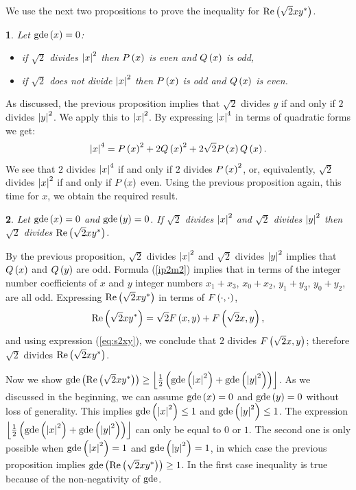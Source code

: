 \documentclass[english,journal]{extarticle}
\makeatletter
\theoremstyle{plain}
\theoremstyle{plain}
\theoremstyle{plain}
\theoremstyle{definition}
\theoremstyle{plain}
\newenvironment{proof}[1][\proofname]{\par
     \normalfont\topsep6\p@\@plus6\p@\relax
     \trivlist
     \itemindent\parindent
     \item[\hskip\labelsep
           \scshape
       #1]\ignorespaces
   }{%
     \endtrivlist\@endpefalse
   }
\providecommand{\proofname}{Proof}
\theoremstyle{plain}
\newtheorem{prop}{\protect\propositionname}
\providecommand{\propositionname}{\inputencoding{latin9}Proposition}
\makeatother
\begin{document}
We use the next two propositions to prove the inequality for
$\re\left(\sqrt{2}xy^{\ast}\right)$.
\begin{prop}
Let $\gde\left(x\right)=0$: 
\begin{itemize}
\item if $\sqrt{2}$ divides \textup{$\abs x^{2}$} then $\P x$ is even
and $\Q x$ is odd,
\item if $\sqrt{2}$ does not divide \textup{$\abs x^{2}$} then $\P x$
is odd and $\Q x$ is even.
\end{itemize}
\end{prop}
\begin{proof}
As discussed, the previous proposition implies that $\sqrt{2}$
divides $y$ if and only if $2$ divides $\abs y^{2}$. We apply this
to $\abs x^{2}$. By expressing $\abs x^{4}$ in terms of quadratic
forms we get: 
\[
\abs x^{4}=\P{x}^{2}+2\Q{x}^{2}+2\sqrt{2}\P{x}\Q{x}.
\]
We see that $2$ divides $\abs x^{4}$ if and only if $2$ divides
$\P{x}^{2}$, or, equivalently, $\sqrt{2}$ divides $\abs x^{2}$
if and only if $\P{x}$ even. Using the previous proposition again, this
time for $x$, we obtain the required result.
\end{proof}

\begin{prop}
Let $\gde\left(x\right)=0$ and $\gde\left(y\right)=0$. If $\sqrt{2}$
divides \textup{$\abs x^{2}$} and $\sqrt{2}$ divides $\abs y^{2}$
then $\sqrt{2}$ divides $\re\left(\sqrt{2}xy^{\ast}\right)$. \end{prop}
\begin{proof}
By the previous proposition, $\sqrt{2}$ divides $\abs x^{2}$ and $\sqrt{2}$
divides $\abs y^{2}$ implies that $\Q{x}$ and
$\Q{y}$ are odd. Formula (\ref{ip2m2}) implies that in terms of the integer number
coefficients of $x$ and $y$ integer numbers
$x_{1}+x_{3}$, $x_{0}+x_{2}$, $y_{1}+y_{3}$, $y_{0}+y_{2}$, are
all odd. Expressing $\re\left(\sqrt{2}xy^{\ast}\right)$ in terms
of $\F{\cdot}{\cdot}$, 
\[
\re\left(\sqrt{2}xy^{\ast}\right)=\sqrt{2}\F xy+\F{\sqrt{2}x}y,
\]
and using expression (\ref{eq:s2xy}), we conclude that $2$ divides $\F{\sqrt{2}x}y$; therefore
$\sqrt{2}$ divides $\re\left(\sqrt{2}xy^{\ast}\right)$.
\end{proof}

Now we show $\gde\left(\re\left(\sqrt{2}xy^{\ast}\right)\right)\ge\left\lfloor
\frac{1}{2}\left(\gde\left(\abs x^{2}\right)+\gde\left(\abs
y^{2}\right)\right)\right\rfloor $.
As we discussed in the beginning, we can assume $\gde\left(x\right)=0$
and $\gde\left(y\right)=0$ without loss of generality. This implies
$\gde\left(\abs x^{2}\right)\le 1$ and $\gde\left(\abs y^{2}\right)\le 1$.
The expression $\left\lfloor \frac{1}{2}\left(\gde\left(\abs
x^{2}\right)+\gde\left(\abs y^{2}\right)\right)\right\rfloor $
can only be equal to $0$ or $1$. The second one is only possible when $\gde\left(\abs
x^{2}\right)=1$ and $\gde\left(\abs y^{2}\right)=1$, in which case the previous proposition implies
$\gde\left(\re\left(\sqrt{2}xy^{\ast}\right)\right)\ge 1$. In the
first case inequality is true because of the non-negativity of $\gde$. 
\end{document}
